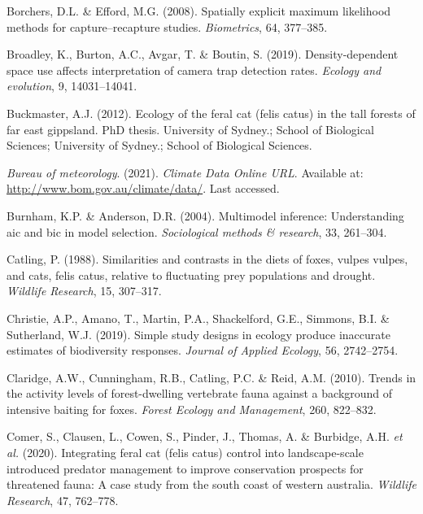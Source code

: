 \documentclass[]{elsarticle} %
\begin{document}
\leavevmode\hypertarget{ref-borchers2008}{}%
Borchers, D.L. \& Efford, M.G. (2008). Spatially explicit maximum likelihood methods for capture--recapture studies. \emph{Biometrics}, 64, 377--385.

\leavevmode\hypertarget{ref-broadley2019}{}%
Broadley, K., Burton, A.C., Avgar, T. \& Boutin, S. (2019). Density-dependent space use affects interpretation of camera trap detection rates. \emph{Ecology and evolution}, 9, 14031--14041.

\leavevmode\hypertarget{ref-2123-8123}{}%
Buckmaster, A.J. (2012). Ecology of the feral cat (felis catus) in the tall forests of far east gippsland. PhD thesis. University of Sydney.; School of Biological Sciences; University of Sydney.; School of Biological Sciences.

\leavevmode\hypertarget{ref-BOM2021}{}%
\emph{Bureau of meteorology}. (2021). \emph{Climate Data Online URL}. Available at: \url{http://www.bom.gov.au/climate/data/}. Last accessed.

\leavevmode\hypertarget{ref-burnham2004}{}%
Burnham, K.P. \& Anderson, D.R. (2004). Multimodel inference: Understanding aic and bic in model selection. \emph{Sociological methods \& research}, 33, 261--304.

\leavevmode\hypertarget{ref-catling1988}{}%
Catling, P. (1988). Similarities and contrasts in the diets of foxes, vulpes vulpes, and cats, felis catus, relative to fluctuating prey populations and drought. \emph{Wildlife Research}, 15, 307--317.

\leavevmode\hypertarget{ref-christie2019}{}%
Christie, A.P., Amano, T., Martin, P.A., Shackelford, G.E., Simmons, B.I. \& Sutherland, W.J. (2019). Simple study designs in ecology produce inaccurate estimates of biodiversity responses. \emph{Journal of Applied Ecology}, 56, 2742--2754.

\leavevmode\hypertarget{ref-claridge2010}{}%
Claridge, A.W., Cunningham, R.B., Catling, P.C. \& Reid, A.M. (2010). Trends in the activity levels of forest-dwelling vertebrate fauna against a background of intensive baiting for foxes. \emph{Forest Ecology and Management}, 260, 822--832.

\leavevmode\hypertarget{ref-comer2020integrating}{}%
Comer, S., Clausen, L., Cowen, S., Pinder, J., Thomas, A. \& Burbidge, A.H. \emph{et al.} (2020). Integrating feral cat (felis catus) control into landscape-scale introduced predator management to improve conservation prospects for threatened fauna: A case study from the south coast of western australia. \emph{Wildlife Research}, 47, 762--778.
\end{document}
